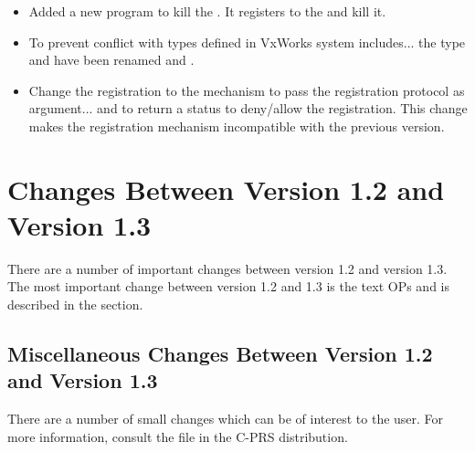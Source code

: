 \begin{itemize}
\item Added a new program  to kill the \MPA{}. It registers to the
\MPA{} and kill it.

\item To prevent conflict with types defined in VxWorks system includes... the
type  and  have been renamed  and
. 

\item Change the registration to the \MPA{} mechanism to pass the registration
protocol as argument... and to return a status to deny/allow the registration.
This change makes the registration mechanism incompatible with the previous
version.

\end{itemize}

\section{Changes Between Version 1.2 and Version 1.3}

There are a number of important changes between version 1.2 and version 1.3.
The most important change between version 1.2 and 1.3 is the text OPs and is
described in the  section.



\subsection{Miscellaneous Changes Between Version 1.2 and Version 1.3}

There are a number of small changes which can be of interest to the user. For
more information, consult the  file in the C-PRS distribution.

